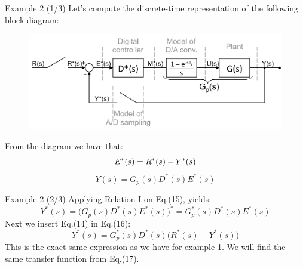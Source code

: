 \begin{frame}
	\begin{exampleblock}{Example 2 (1/3)}
		Let's compute the discrete-time representation of the following block diagram:
		\vspace{-1.5em}
		\begin{figure}
			\centering
			\includegraphics[width=1\linewidth]{block_analysis_4}
			\vspace{-1.5em}
		\end{figure}
		From the diagram we have that: 
		\vspace{-1em}
		\begin{equation}
		E^{*}(s) = R^{*}(s) - Y^{*}(s)
		\vspace{-1em}
		\end{equation}
		\begin{equation}
		Y(s) = G_p(s)D^{*}(s)E^{*}(s)
		\end{equation}
	\end{exampleblock}
\end{frame}

\begin{frame}
	\begin{exampleblock}{Example 2 (2/3)}
		Applying Relation I on Eq.(15), yields:
		\begin{equation}
		Y^{*}(s) = \big ( G_p(s)D^{*}(s)E^{*}(s) \big )^{*} = G_p^{*}(s)D^{*}(s)E^{*}(s)
		\end{equation}
		Next we insert Eq.(14) in Eq.(16):
		\begin{equation}
		Y^{*}(s) = G_p^{*}(s)D^{*}(s) \big ( R^{*}(s) - Y^{*}(s) \big)
		\end{equation}
		This is the exact same expression as we have for example 1. We will find the same transfer function from Eq.(17).
	\end{exampleblock}
\end{frame}

